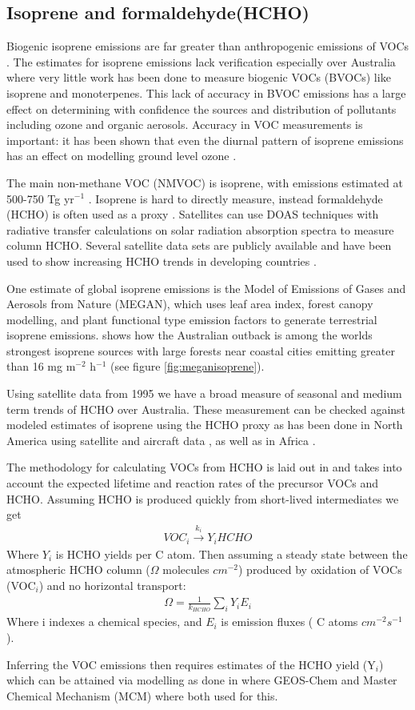 \subsection{Isoprene and formaldehyde(HCHO)}

Biogenic isoprene emissions are far greater than anthropogenic emissions of VOCs \cite{Guenther_2006}. 
The estimates for isoprene emissions lack verification especially over Australia where very little work has been done to measure biogenic VOCs (BVOCs) like isoprene and monoterpenes.
This lack of accuracy in BVOC emissions has a large effect on determining with confidence the sources and distribution of pollutants including ozone and organic aerosols.
Accuracy in VOC measurements is important: it has been shown that even the diurnal pattern of isoprene emissions has an effect on modelling ground level ozone \cite{Hewitt_2011,Fan_2004}.

The main non-methane VOC (NMVOC) is isoprene, with emissions estimated at 500-750 Tg yr$^{-1}$ \cite{Guenther_2006}.
Isoprene is hard to directly measure, instead formaldehyde (HCHO) is often used as a proxy \cite{Marais_2012,bauwens2013satellite}.
Satellites can use DOAS techniques with radiative transfer calculations on solar radiation absorption spectra to measure column HCHO.
Several satellite data sets are publicly available and have been used to show increasing HCHO trends in developing countries \cite{Mahajan_2015}.

One estimate of global isoprene emissions is the Model of Emissions of Gases and Aerosols from Nature (MEGAN), which uses leaf area index, forest canopy modelling, and plant functional type emission factors to generate terrestrial isoprene emissions.
\citet{Guenther_2006} shows how the Australian outback is among the worlds strongest isoprene sources with large forests near coastal cities emitting greater than 16 mg m$^{-2}$ h$^{-1}$ (see figure \ref{fig:meganisoprene}).

Using satellite data from 1995 we have a broad measure of seasonal and medium term trends of HCHO over Australia.
These measurement can be checked against modeled estimates of isoprene using the HCHO proxy as has been done in North America using satellite and aircraft data \cite{Millet_2006}, as well as in Africa \cite{Marais_2014}.

The methodology for calculating VOCs from HCHO is laid out in \citet{Palmer_2003} and takes into account the expected lifetime and reaction rates of the precursor VOCs and HCHO.
Assuming HCHO is produced quickly from short-lived intermediates we get
\begin{eqnarray*}
VOC_i \overset{k_i}{\rightarrow} Y_i HCHO
\end{eqnarray*}
Where $Y_i$ is HCHO yields per C atom.
Then assuming a steady state between the atmospheric HCHO column ($\Omega$ molecules $cm^{-2}$)  produced by oxidation of VOCs (VOC$_i$) and no horizontal transport:
\begin{eqnarray*}
\Omega = \frac{1}{k_{HCHO}} \sum_{i} Y_i E_i
\end{eqnarray*}
Where i indexes a chemical species, and $E_i$ is emission fluxes ( C atoms $cm^{-2}s^{-1}$).

Inferring the VOC emissions then requires estimates of the HCHO yield (Y$_i$) which can be attained via modelling as done in \citet{Millet_2006} where GEOS-Chem and Master Chemical Mechanism (MCM) where both used for this.

